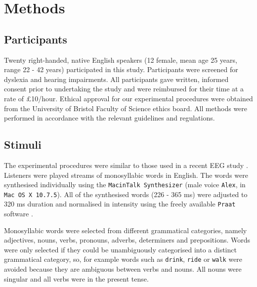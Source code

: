 \documentclass[10pt,letterpaper]{article}
\newcommand{\citet}[1]{\cite{#1}}
\begin{document}
\section*{Methods}
\subsection*{Participants}

Twenty right-handed, native English speakers (12 female, mean age 25
years, range 22 - 42 years) participated in this study. Participants
were screened for dyslexia and hearing impairments. All participants
gave written, informed consent prior to undertaking the study and were
reimbursed for their time at a rate of £10/hour. Ethical approval for
our experimental procedures were obtained from the University of
Bristol Faculty of Science ethics board. All methods were performed in
accordance with the relevant guidelines and regulations.

\subsection*{Stimuli}

The experimental procedures were similar to those used in a recent EEG
study \cite{DingEtAl2017}. Listeners were played streams of
monosyllabic words in English. The words were synthesised individually
using the \texttt{MacinTalk Synthesizer} (male voice \texttt{Alex}, in
\texttt{Mac OS X 10.7.5}). All of the synthesised words (226 - 365 ms)
were adjusted to 320 ms duration and normalised in intensity using the
freely available \texttt{Praat} software \citet{Praat}.

Monosyllabic words were selected from different grammatical categories,
namely adjectives, nouns, verbs, pronouns, adverbs, determiners and
prepositions. Words were only selected if they could be unambiguously
categorised into a distinct grammatical category, so, for example
words such as \texttt{drink}, \texttt{ride} or \texttt{walk} were
avoided because they are ambiguous between verbs and nouns. All nouns
were singular and all verbs were in the present tense.
\end{document}
